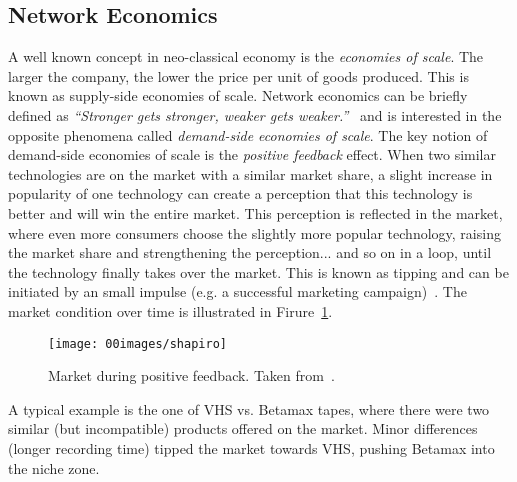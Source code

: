 \subsection{Network Economics}

A well known concept in neo-classical economy is the \textit{economies of scale}. The larger the company, the lower the price per unit of goods produced. This is known as supply-side economies of scale. Network economics can be briefly defined as \textit{``Stronger gets stronger, weaker gets weaker.''}~\cite{Shapiro1998InformationEconomy} and is interested in the opposite phenomena called \textit{demand-side economies of scale}. The key notion of demand-side economies of scale is the \textit{positive feedback} effect. When two similar technologies are on the market with a similar market share, a slight increase in popularity of one technology can create a perception that this technology is better and will win the entire market. This perception is reflected in the market, where even more consumers choose the slightly more popular technology, raising the market share and strengthening the perception... and so on in a loop, until the technology finally takes over the market. This is known as tipping and can be initiated by an small impulse (e.g. a successful marketing campaign)~\cite{Shapiro1998InformationEconomy}. The market condition over time is illustrated in Firure~\ref{fig:tipping}.

\begin{figure}[ht]
    \centering
    \texttt{[image: 00images/shapiro]}
    \caption{Market during positive feedback. Taken from~\cite{Shapiro1998InformationEconomy}.}
    \label{fig:tipping}
\end{figure}

A typical example is the one of VHS vs. Betamax tapes, where there were two similar (but incompatible) products offered on the market. Minor differences (longer recording time) tipped the market towards VHS, pushing Betamax into the niche zone.

